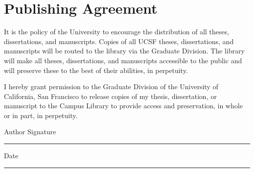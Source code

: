 \chapter[UCSF Library Release]{Publishing Agreement}

\noindent It is the policy of the University to encourage the distribution of all theses, dissertations, and manuscripts. Copies of all UCSF theses, dissertations, and manuscripts will be routed to the library via the Graduate Division. The library will make all theses, dissertations, and manuscripts accessible to the public and will preserve these to the best of their abilities, in perpetuity.

\noindent I hereby grant permission to the Graduate Division of the University of California, San Francisco to release copies of my thesis, dissertation, or manuscript to the Campus Library to provide access and preservation, in whole or in part, in perpetuity.

\noindent Author Signature \rule{8cm}{1pt} Date \rule{4cm}{1pt}
